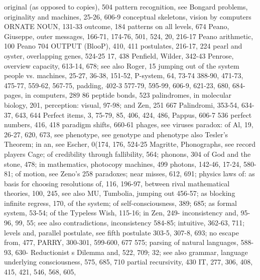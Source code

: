 original (as opposed to copies), 504             pattern recognition, see Bongard problems,
originality and machines, 25-26, 606-9           conceptual skeletons, vision by computers
ORNATE NOUN, 131-33 outcome, 184                 patterns on all levels, 674 Peano, Giuseppe,
outer messages, 166-71, 174-76, 501, 524,        20, 216-17 Peano arithmetic, 100 Peano
704 OUTPUT (BlooP), 410, 411                     postulates, 216-17, 224 pearl and oyster,
overlapping genes, 524-25                        17, 438 Penfield, Wilder, 342-43 Penrose,
overview capacity, 613-14, 678; see also         Roger, 15
jumping out of the system                        people vs. machines, 25-27, 36-38, 151-52,
P-system, 64, 73-74                              388-90, 471-73, 475-77, 559-62, 567-75,
padding, 402-3                                   577-79, 595-99, 606-9, 621-23, 680, 684-
pages, in computers, 289                         86 peptide bonds, 523
palindromes, in molecular biology, 201,          perception: visual, 97-98; and Zen, 251
667 Palindromi, 353-54, 634-37, 643, 644         Perfect items, 3, 75-79, 85, 406, 424, 486,
Pappus, 606-7                                    536 perfect numbers, 416, 418
paradigm shifts, 660-61                          phages, see viruses
paradox: of Al, 19, 26-27, 620, 673, see         phenotype, see genotype and phenotype
also Tesler's Theorem; in an, see Escher,        0(174, 176, 524-25
Magritte,                                        Phonographs, see record players
Cage; of credibility through fallibility, 564;   phonons, 304
of God and the stone, 478; in mathematics,       photocopy machines, 499 photons, 142-46,
17-24, 580-81; of motion, see Zeno's             258
paradoxes; near misses, 612, 691;                physics laws of: as basis for choosing
resolutions of, 116, 196-97,                     between rival mathematical theories, 100,
245, see also MU, Tumbolia, jumping out          456-57; as blocking infinite regress, 170,
of the system; of self-consciousness, 389;       685;     as     formal     system,    53-54;
of the Typeless Wish, 115-16; in Zen, 249-       inconsistency and, 95-96, 99,
55; see also contradictions, inconsistency       584-85; intuitive, 362-63, 711; levels and,
parallel postulate, see fifth postulate          303-5, 307-8, 693; no escape from, 477,
PARRY, 300-301, 599-600, 677                     575;
parsing of natural languages, 588-93, 630-       Reductionist s Dilemma and, 522, 709;
32; see also grammar, language                   underlying consciousness, 575, 685, 710
partial recursivity, 430                         IT, 277, 306, 408, 415, 421, 546, 568, 605,
